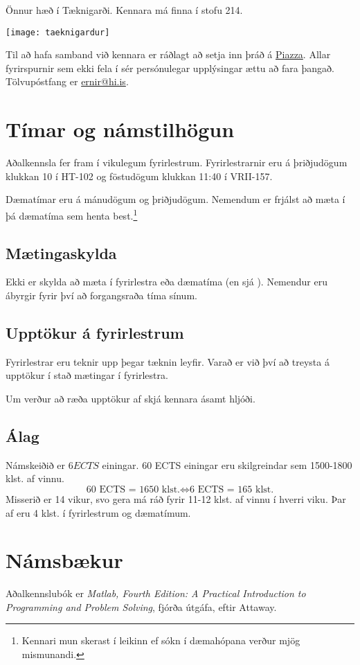 \documentclass[justified, nobib]{tufte-handout}
\begin{document}
\begin{marginfigure}
\caption{Önnur hæð í Tæknigarði. Kennara má finna í stofu 214.}
\label{fig:taeknigardur}
\begin{center}
\texttt{[image: taeknigardur]}
\end{center}
\end{marginfigure}

Til að hafa samband við kennara er ráðlagt að setja inn þráð á \href{piazza.com/hi.is/fall2017/tl105g/home}{Piazza}. Allar fyrirspurnir sem ekki fela í sér persónulegar upplýsingar ættu að fara þangað. Tölvupóstfang er \href{mailto:ernir@hi.is}{ernir@hi.is}.

\section{Tímar og námstilhögun}
Aðalkennsla fer fram í vikulegum fyrirlestrum. Fyrirlestrarnir eru á þriðjudögum klukkan 10 í HT-102 og föstudögum klukkan 11:40 í VRII-157.

Dæmatímar eru á mánudögum og þriðjudögum. Nemendum er frjálst að mæta í þá dæmatíma sem henta best.\footnote{Kennari mun skerast í leikinn ef sókn í dæmahópana verður mjög mismunandi.}

\subsection{Mætingaskylda}
Ekki er skylda að mæta í fyrirlestra eða dæmatíma (en sjá ). Nemendur eru ábyrgir fyrir því að forgangsraða tíma sínum.
\subsection{Upptökur á fyrirlestrum}
Fyrirlestrar eru teknir upp þegar tæknin leyfir. Varað er við því að treysta á upptökur í stað mætingar í fyrirlestra.

Um verður að ræða upptökur af skjá kennara ásamt hljóði.
\subsection{Álag}
Námskeiðið er $6 ECTS$ einingar. 60 ECTS einingar eru skilgreindar sem 1500-1800 klst. af vinnu.
\[
\text{60 ECTS = 1650 klst.} \Longleftrightarrow \text{6 ECTS = 165 klst.}
\]
Misserið er 14 vikur, svo gera má ráð fyrir 11-12 klst. af vinnu í hverri viku. Þar af eru 4 klst. í fyrirlestrum og dæmatímum.
\section{Námsbækur}
Aðalkennslubók er \emph{Matlab, Fourth Edition: A Practical Introduction to Programming and Problem Solving}, fjórða útgáfa, eftir Attaway.
\end{document}
